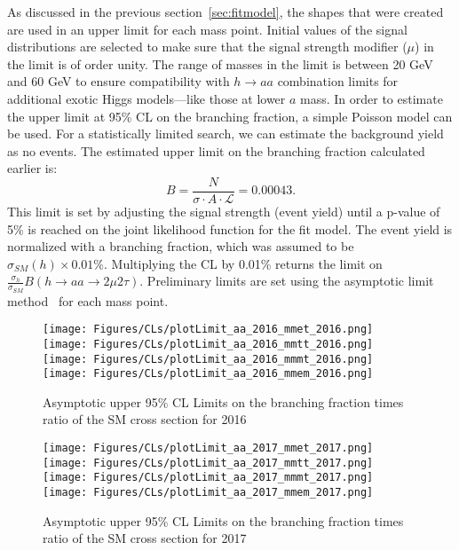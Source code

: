 As discussed in the previous section~\ref{sec:fitmodel}, the shapes that were created are used in an upper limit for each mass point. 
Initial values of the signal distributions are selected to make sure that the signal strength modifier ($\mu$) in the limit is of order unity. 
The range of masses in the limit is between 20 GeV and 60 GeV to ensure compatibility with $h \rightarrow a a $ combination limits for additional exotic Higgs models---like those at lower $a$ mass. 
In order to estimate the upper limit at 95\% CL on the branching fraction, a simple Poisson model can be used. For a statistically limited search, we can estimate the background yield as no events. The estimated upper limit on the branching fraction calculated earlier is: 
\begin{equation}B =  \frac{N}{\sigma \cdot A\cdot \mathcal{L}} = 0.00043  \text{.}\end{equation} 
This limit is set by adjusting the signal strength (event yield) until a p-value of 5\% is reached on the joint likelihood function for the fit model. 
The event yield is normalized with a branching fraction, which was assumed to be $\sigma_{SM}(h) \times 0.01\%$.
Multiplying the CL by 0.01\% returns the limit on $\frac{\sigma_h}{\sigma_{SM}} B(h\rightarrow aa\rightarrow2\mu2\tau)$.
Preliminary limits are set using the asymptotic limit method~\cite{Cowan_2011} for each mass point.


\begin{figure}[ht!b]
  \centering
  \texttt{[image: Figures/CLs/plotLimit\_aa\_2016\_mmet\_2016.png]}
  \texttt{[image: Figures/CLs/plotLimit\_aa\_2016\_mmtt\_2016.png]}\\
  \texttt{[image: Figures/CLs/plotLimit\_aa\_2016\_mmmt\_2016.png]}
  \texttt{[image: Figures/CLs/plotLimit\_aa\_2016\_mmem\_2016.png]}\\
    \caption{\label{fig:CLs2016} Asymptotic upper 95\% CL Limits on the branching fraction times ratio of the SM cross section for 2016}
\end{figure}

\begin{figure}[ht!b]
  \centering
  \texttt{[image: Figures/CLs/plotLimit\_aa\_2017\_mmet\_2017.png]}
  \texttt{[image: Figures/CLs/plotLimit\_aa\_2017\_mmtt\_2017.png]}\\
  \texttt{[image: Figures/CLs/plotLimit\_aa\_2017\_mmmt\_2017.png]}
  \texttt{[image: Figures/CLs/plotLimit\_aa\_2017\_mmem\_2017.png]}\\
    \caption{\label{fig:CLs2017} Asymptotic upper 95\% CL Limits on the branching fraction times ratio of the SM cross section for 2017}
\end{figure}

